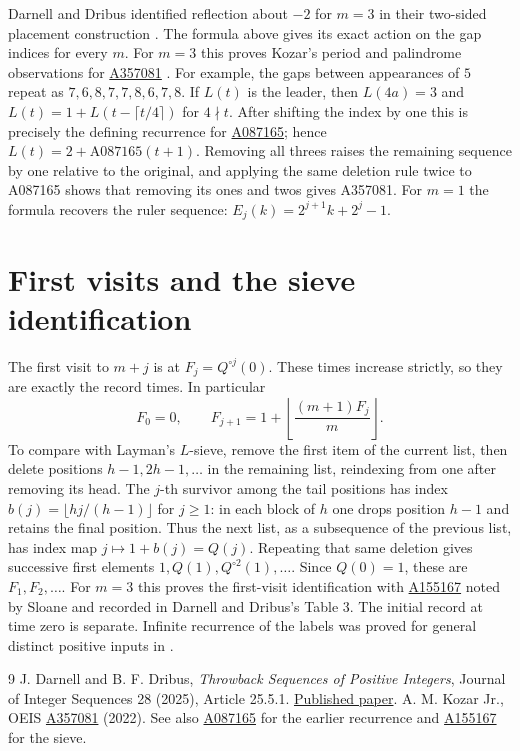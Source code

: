 \documentclass[11pt]{article}
\begin{document}
Darnell and Dribus identified reflection about $-2$ for $m=3$ in their two-sided placement construction \cite[Sec.\ 4]{dd}. The formula above gives its exact action on the gap indices for every $m$.
For $m=3$ this proves Kozar's period and palindrome observations for
\href{https://oeis.org/A357081}{A357081} \cite{kozar}. For example, the
gaps between appearances of $5$ repeat as
$7,6,8,7,7,8,6,7,8$. If $L(t)$ is the leader, then $L(4a)=3$ and
$L(t)=1+L(t-\lceil t/4\rceil)$ for $4\nmid t$. After shifting the
index by one this is precisely the defining recurrence for
\href{https://oeis.org/A087165}{A087165}; hence $L(t)=2+\mathrm{A087165}(t+1)$.
Removing all threes raises the remaining sequence by one relative to the
original, and applying the same deletion rule twice to A087165 shows that
removing its ones and twos gives A357081. For $m=1$ the formula recovers
the ruler sequence: $E_j(k)=2^{j+1}k+2^j-1$.

\section{First visits and the sieve identification}
The first visit to $m+j$ is at $F_j=Q^{\circ j}(0)$. These times increase
strictly, so they are exactly the record times. In particular
\[
 F_0=0,\qquad F_{j+1}=1+\left\lfloor\frac{(m+1)F_j}{m}\right\rfloor.
\]
To compare with Layman's $L$-sieve, remove the first item of the current
list, then delete positions $h-1,2h-1,\ldots$ in the remaining list,
reindexing from one after removing its head. The $j$-th survivor among
the tail positions has index $b(j)=\lfloor hj/(h-1)\rfloor$ for $j\ge1$:
in each block of $h$ one drops position $h-1$ and retains the final
position. Thus the next list, as a subsequence of the previous list,
has index map $j\mapsto1+b(j)=Q(j)$. Repeating that same deletion
gives successive first elements $1,Q(1),Q^{\circ2}(1),\ldots$.
Since $Q(0)=1$, these are $F_1,F_2,\ldots$.
For $m=3$ this proves the first-visit identification with
\href{https://oeis.org/A155167}{A155167} noted by Sloane and recorded in
Darnell and Dribus's Table 3. The initial record at time zero is separate.
Infinite recurrence of the labels was proved for general distinct positive
inputs in \cite[Thm.\ 2]{dd}.

\begin{thebibliography}{9}
 J. Darnell and B. F. Dribus, \emph{Throwback Sequences of
Positive Integers}, Journal of Integer Sequences 28 (2025), Article 25.5.1.
\href{https://cs.uwaterloo.ca/journals/JIS/VOL28/Dribus/dribus4.pdf}{Published paper}.
 A. M. Kozar Jr., OEIS \href{https://oeis.org/A357081}{A357081}
(2022). See also \href{https://oeis.org/A087165}{A087165} for the
earlier recurrence and \href{https://oeis.org/A155167}{A155167} for the sieve.
\end{thebibliography}
\end{document}
